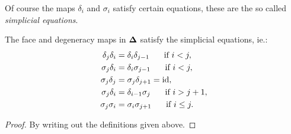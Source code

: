 Of course the maps $\delta_i$ and $\sigma_i$ satisfy certain equations, these are the so called \emph{simplicial equations}.

\begin{lemma}
	The face and degeneracy maps in $\mathbf{\Delta}$ satisfy the simplicial equations, ie.:
	\begin{align}
		\delta_j\delta_i &= \delta_i\delta_{j-1}  \hspace{0.5cm} \text{ if } i < j,\\
		\sigma_j\delta_i &= \delta_i\sigma_{j-1}  \hspace{0.5cm} \text{ if } i < j,\\
		\sigma_j\delta_j &= \sigma_j\delta_{j+1} = \text{id},\\
		\sigma_j\delta_i &= \delta_{i-1}\sigma_j  \hspace{0.5cm} \text{ if } i > j+1,\\
		\sigma_j\sigma_i &= \sigma_i\sigma_{j+1}  \hspace{0.5cm} \text{ if } i \leq j.
	\end{align}
\end{lemma}
\begin{proof}
	By writing out the definitions given above.
\end{proof}

